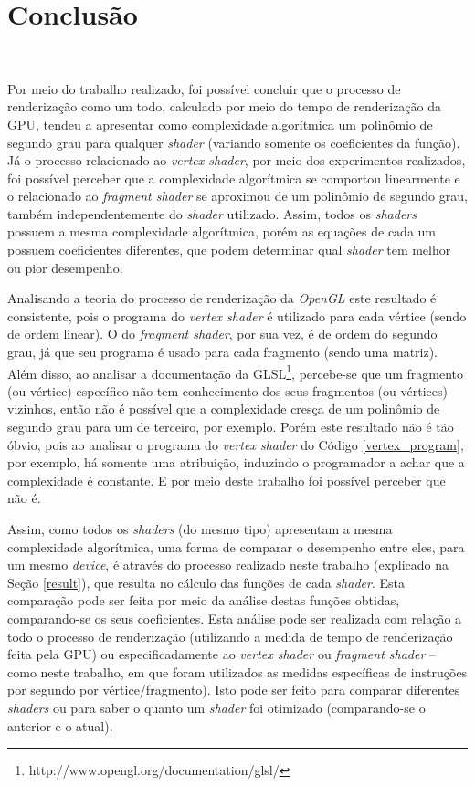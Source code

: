 \chapter[Conclusao]{Conclusão}\

	Por meio do trabalho realizado, foi possível concluir que o processo de renderização como um todo, calculado por meio do tempo de renderização da GPU, tendeu a apresentar como complexidade algorítmica um polinômio de segundo grau para qualquer \textit{shader} (variando somente os coeficientes da função).  Já o processo relacionado ao \textit{vertex shader}, por meio dos experimentos realizados, foi possível perceber que a complexidade algorítmica se comportou linearmente e o relacionado ao \textit{fragment shader} se aproximou de um polinômio de segundo grau, também independentemente do \textit{shader} utilizado. Assim, todos os \textit{shaders} possuem a mesma complexidade algorítmica, porém as equações de cada um possuem coeficientes diferentes, que podem determinar qual \textit{shader} tem melhor ou pior desempenho.

	Analisando a teoria do processo de renderização da \textit{OpenGL} este resultado é consistente, pois o programa do \textit{vertex shader} é utilizado para cada vértice (sendo de ordem linear).  O do \textit{fragment shader}, por sua vez, é de ordem do segundo grau, já que seu programa é usado para cada fragmento (sendo uma matriz). Além disso, ao analisar a documentação da GLSL\footnote{http://www.opengl.org/documentation/glsl/}, percebe-se que um fragmento (ou vértice) específico não tem conhecimento dos seus fragmentos (ou vértices) vizinhos, então não é possível que a complexidade cresça de um polinômio de segundo grau para um de terceiro, por exemplo. Porém este resultado não é tão óbvio, pois ao analisar o programa do \textit{vertex shader} do Código \ref{vertex_program}, por exemplo, há somente uma atribuição, induzindo o programador  a achar que a complexidade é constante. E por meio deste trabalho foi possível perceber que não é.

	 
	
	Assim, como todos os \textit{shaders} (do mesmo tipo) apresentam a mesma complexidade algorítmica, uma forma de comparar o desempenho entre eles, para um mesmo \textit{device}, é através do processo realizado neste trabalho (explicado na Seção \ref{result}), que resulta no cálculo das funções de cada \textit{shader}. Esta comparação pode ser feita por meio da análise destas funções obtidas, comparando-se os seus coeficientes. Esta análise pode ser realizada com relação a todo o processo de renderização (utilizando a medida de tempo de renderização feita pela GPU) ou especificadamente ao \textit{vertex shader} ou \textit{fragment shader} -- como neste trabalho, em que foram utilizados as medidas específicas de instruções por segundo por vértice/fragmento).  Isto pode ser feito para comparar diferentes \textit{shaders} ou para saber o quanto um \textit{shader} foi otimizado (comparando-se o anterior e o atual). 

